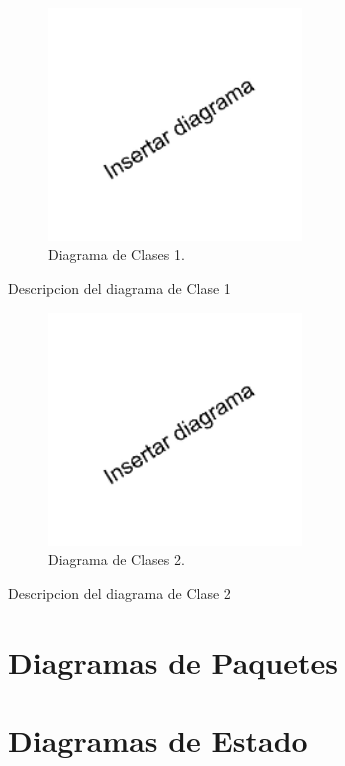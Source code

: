\documentclass[titlepage,a4paper]{article}
\begin{document}

\begin{figure}[H]
  \centering
  \includegraphics[width=0.6\textwidth]{diagrama_clase01.png}
  \caption{\label{fig:class01}Diagrama de Clases 1.}
  \end{figure}

  Descripcion del diagrama de Clase 1
  
\begin{figure}[H]
\centering
\includegraphics[width=0.6\textwidth]{diagrama_clase02.png}
\caption{\label{fig:class02}Diagrama de Clases 2.}
\end{figure}

Descripcion del diagrama de Clase 2


\section{Diagramas de Paquetes}\label{sec:diagramasdepaquetes}


\section{Diagramas de Estado}\label{sec:diagramasdeestado}
\end{document}
